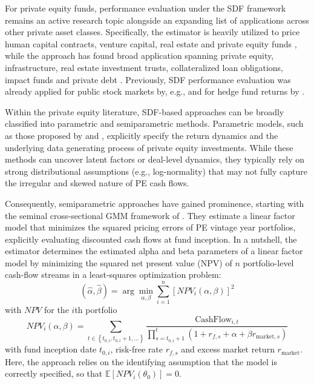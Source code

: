 For private equity funds, performance evaluation under the SDF framework remains an active research topic \citep{DLP12, KN16, KN24, giommetti2021risk, GN18, boyer2023discount,korteweg2024private} alongside an expanding list of applications across other private asset classes.
Specifically, the \cite{DLP12} estimator is heavily utilized to price human capital contracts, venture capital, real estate and private equity funds \citep{kroencke2013return,kim2015estimation,farrelly2019risk,lee2019new,zhao2020master,TP24}, while the \cite{KN16} approach has found broad application spanning private equity, infrastructure, real estate investment trusts, collateralized loan obligations, impact funds and private debt \citep{giommetti2021risk,andonov2021institutional,riddiough2022private,boyer2023discount,cordell2023clo,erel2024risk,jeffers2024risk,KN24}.
Previously, SDF performance evaluation was already applied for public stock markets by, e.g., \cite{FFJT02} and for hedge fund returns by \cite{LXZ16}.

Within the private equity literature, SDF-based approaches can be broadly classified into parametric and semiparametric methods.
Parametric models, such as those proposed by \cite{FNP12} and \cite{ACGP18}, explicitly specify the return dynamics and the underlying data generating process of private equity investments. 
While these methods can uncover latent factors or deal-level dynamics, they typically rely on strong distributional assumptions (e.g., log-normality) that may not fully capture the irregular and skewed nature of PE cash flows.

Consequently, semiparametric approaches have gained prominence, starting with the seminal cross-sectional GMM framework of \cite{DLP12}. 
They estimate a linear factor model that minimizes the squared pricing errors of PE vintage year portfolios, explicitly evaluating discounted cash flows at fund inception.
In a nutshell, the \cite{DLP12} estimator determines the estimated alpha and beta parameters of a linear factor model by minimizing the squared net present value (NPV) of $n$ portfolio-level cash-flow streams in a least-squares optimization problem:
\begin{equation}
	\label{eq:dlp12_minimization}
 	\left(\hat{\alpha}, \hat{\beta} \right) = 
 	\arg \min_{\alpha,\beta} \sum_{i=1}^n \left[ {NPV}_i(\alpha,\beta) \right]^2
\end{equation}
with $NPV$ for the $i$th portfolio
\[
{NPV}_i(\alpha,\beta) =
\sum_{t \in \left\{ t_{0,i}, t_{0,i} + 1, \dots \right\}}
\frac{\mathrm{CashFlow}_{i,t}}{
	\prod_{s=t_{0,i}+1}^{t}
	\left( 
	1 + r_{f, s} + \alpha + \beta r_{\mathrm{market}, s}
	\right)
} 
\]
with fund inception date $t_{0,i}$, risk-free rate $r_{f, s}$ and excess market return $r_{\mathrm{market}}$.
Here, the \cite{DLP12} approach relies on the identifying assumption that the model is correctly specified, so that $\mathbb{E}[NPV_i(\theta_0)] = 0$.

